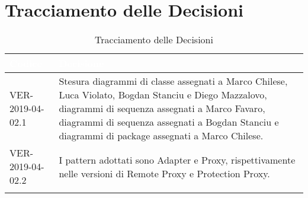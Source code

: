 \newpage
\section{Tracciamento delle Decisioni}

\begin{longtable}{|C{.40\textwidth}|C{.60\textwidth}|}
\hline
{}\textbf{\textcolor{white}{Codice}} & \textbf{\textcolor{white}{Decisione}}\\
\hline
VER-2019-04-02.1 & Stesura diagrammi di classe assegnati a Marco Chilese, Luca Violato, Bogdan Stanciu e Diego Mazzalovo, diagrammi di sequenza assegnati a Marco Favaro, diagrammi di sequenza assegnati a Bogdan Stanciu e diagrammi di package assegnati a Marco Chilese. \\
\hline
{}VER-2019-04-02.2 & I pattern adottati sono Adapter e Proxy, rispettivamente nelle versioni di Remote Proxy e Protection Proxy. \\
\hline

\caption{Tracciamento delle Decisioni}
\end{longtable}
